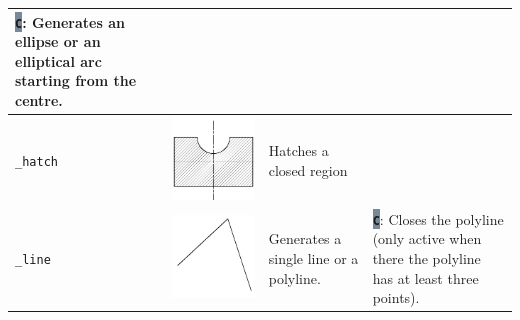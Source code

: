 \documentclass[..]{../IEEEphot}
\newcommand{\param}[1]{\colorbox{LightSlateGray}{\color{Navy}\texttt{\textbf{#1}}}}
\begin{document}
\begin{center}
\begin{longtable}{m{.1\linewidth}m{.2\linewidth}m{.3\linewidth}m{.3\linewidth}}
\param{C}: Generates an ellipse or an elliptical arc starting from the centre.
\\
\midrule
\texttt{\_hatch} & \includegraphics[width = 0.8\linewidth, keepaspectratio]{../images/jpg/_hatch.jpg} & Hatches a closed region & 
\\
\midrule
\texttt{\_line} & \includegraphics[width = 0.8\linewidth, keepaspectratio]{../images/jpg/_line.jpg} & Generates a single line or a polyline. & 
\param{C}: Closes the polyline (only active when there the polyline has at least three points). \\
\midrule

\end{longtable}
\end{center}
\end{document}
